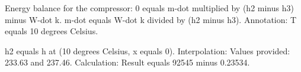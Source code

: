 Energy balance for the compressor:  
0 equals m-dot multiplied by (h2 minus h3) minus W-dot k.  
m-dot equals W-dot k divided by (h2 minus h3).  
Annotation: T equals 10 degrees Celsius.  

h2 equals h at (10 degrees Celsius, x equals 0).  
Interpolation:  
Values provided:  
233.63 and 237.46.  
Calculation:  
Result equals 92545 minus 0.23534.